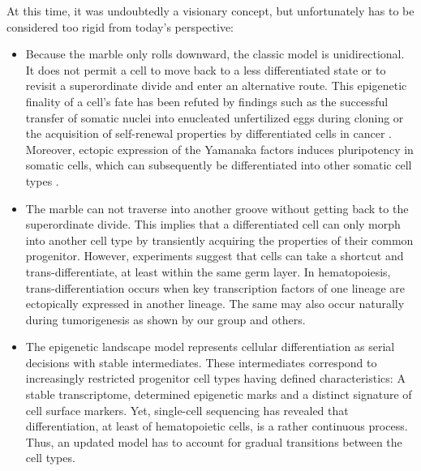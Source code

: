 At this time, it was undoubtedly a visionary concept, but unfortunately has to be considered too rigid from today's perspective: 

\begin{itemize}
	\item Because the marble only rolls downward, the classic model is unidirectional. It does not permit a cell to move back to a less differentiated state or to revisit a superordinate divide and enter an alternative route. This epigenetic finality of a cell's fate has been refuted by findings such as the successful transfer of somatic nuclei into enucleated unfertilized eggs during cloning\cite{Gurdon1962,Byrne2003,Campbell1996,Wilmut1997} or the acquisition of self-renewal properties by differentiated cells in cancer \cite{Hermann2007,Schepers2012,Driessens2012}. Moreover, ectopic expression of the Yamanaka factors induces pluripotency in somatic cells, which can subsequently be differentiated into other somatic cell types \cite{Takahashi2006,Liu2008a}.  
	 \item The marble can not traverse into another groove without getting back to the superordinate divide. This implies that a differentiated cell can only morph into another cell type by transiently acquiring the properties of their common progenitor. However,  experiments suggest that cells can take a shortcut and trans-differentiate, at least within the same germ layer. In hematopoiesis, trans-differentiation occurs when key transcription factors of one lineage are ectopically expressed in another lineage\cite{Feng2008,Kallin2012}. The same may also occur naturally during tumorigenesis as shown by our group\cite{Riemke2016} and others\cite{Feldman2008,Fraser2009,West2013}. 
	 \item The epigenetic landscape model represents cellular differentiation as serial decisions with stable intermediates. These intermediates correspond to increasingly restricted progenitor cell types having defined characteristics: A stable transcriptome, determined epigenetic marks and a distinct signature of cell surface markers. Yet, single-cell sequencing has revealed that differentiation, at least of hematopoietic cells, is a rather continuous process\cite{Velten2017,Macaulay2016}. Thus, an updated model has to account for gradual transitions between the cell types.  

\end{itemize}

